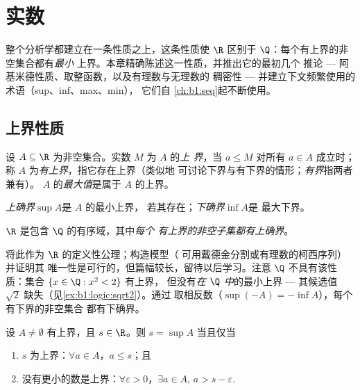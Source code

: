 \chapter{实数}\label{ch:b1:reals}

整个分析学都建立在一条性质之上，这条性质使 $\R$ 区别于
$\Q$：每个有上界的非空集合都有\emph{最小}
上界。本章精确陈述这一性质，并推出它的最初几个
推论 --- 阿基米德性质、取整函数，以及有理数与无理数的
稠密性 --- 并建立下文频繁使用的术语（sup、inf、max、min），
它们自
\cref{ch:b1:seq}起不断使用。

\section{上界性质}

\begin{definition}[界、上确界与下确界]\label{def:b1:reals:bounds}
设 $A \subseteq \R$ 为非空集合。实数 $M$ 为 $A$ 的\emph{上
界}，当 $a \leq M$ 对所有 $a \in A$ 成立时；
称 $A$ 为\emph{有上界}，指它存在上界（类似地
可讨论下界与有下界的情形；\emph{有界}指两者兼有）。
$A$ 的\emph{最大值}是属于 $A$ 的上界。

\emph{上确界}$\sup A$是 $A$ 的最小上界，
若其存在；\emph{下确界}$\inf A$是
最大下界。
\end{definition}

\begin{theorem}[$\R$ 的完备性公理]\label{thm:b1:reals:sup}
$\R$ 是包含 $\Q$ 的有序域，其中\emph{每个
有上界的非空子集都有上确界}。
\end{theorem}
\admitted

\begin{remark}
将此作为 $\R$ 的定义性公理；构造模型（
可用戴德金分割或有理数的柯西序列）并证明其
唯一性是可行的，但篇幅较长，留待以后学习。注意
$\Q$ 不具有该性质：集合 $\{x \in \Q : x^2 < 2\}$ 有上界，
但没有\emph{在 $\Q$ 中}的最小上界 --- 其候选值
$\sqrt 2$ 缺失（见\cref{ex:b1:logic:sqrt2}）。通过
取相反数（$\sup(-A) = -\inf A$），每个有下界的非空集合
都有下确界。
\end{remark}

\begin{proposition}[$\varepsilon$ 刻画]\label{prop:b1:reals:epsilon}
设 $A \neq \emptyset$ 有上界，且 $s \in \R$。则 $s =
\sup A$ 当且仅当
\begin{enumerate}
  \item $s$ 为上界：$\forall a \in A$，$a \leq s$；且
  \item 没有更小的数是上界：$\forall \varepsilon > 0$，$\exists a \in
        A$, $a > s - \varepsilon$.
\end{enumerate}
\end{proposition}

